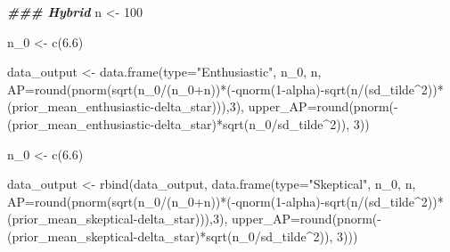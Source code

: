 \documentclass[
]{book}
\newenvironment{Shaded}{\begin{snugshade}}{\end{snugshade}}
\newcommand{\AttributeTok}[1]{\textcolor[rgb]{0.77,0.63,0.00}{#1}}
\newcommand{\DecValTok}[1]{\textcolor[rgb]{0.00,0.00,0.81}{#1}}
\newcommand{\DocumentationTok}[1]{\textcolor[rgb]{0.56,0.35,0.01}{\textbf{\textit{#1}}}}
\newcommand{\FloatTok}[1]{\textcolor[rgb]{0.00,0.00,0.81}{#1}}
\newcommand{\FunctionTok}[1]{\textcolor[rgb]{0.00,0.00,0.00}{#1}}
\newcommand{\NormalTok}[1]{#1}
\newcommand{\OtherTok}[1]{\textcolor[rgb]{0.56,0.35,0.01}{#1}}
\newcommand{\SpecialCharTok}[1]{\textcolor[rgb]{0.00,0.00,0.00}{#1}}
\newcommand{\StringTok}[1]{\textcolor[rgb]{0.31,0.60,0.02}{#1}}
\begin{document}
\begin{Shaded}
\begin{Highlighting}[]
\DocumentationTok{\#\#\# Hybrid}
\NormalTok{n }\OtherTok{\textless{}{-}} \DecValTok{100}

\NormalTok{n\_0 }\OtherTok{\textless{}{-}} \FunctionTok{c}\NormalTok{(}\FloatTok{6.6}\NormalTok{)}

\NormalTok{data\_output }\OtherTok{\textless{}{-}} \FunctionTok{data.frame}\NormalTok{(}\AttributeTok{type=}\StringTok{"Enthusiastic"}\NormalTok{, n\_0, n, }\AttributeTok{AP=}\FunctionTok{round}\NormalTok{(}\FunctionTok{pnorm}\NormalTok{(}\FunctionTok{sqrt}\NormalTok{(n\_0}\SpecialCharTok{/}\NormalTok{(n\_0}\SpecialCharTok{+}\NormalTok{n))}\SpecialCharTok{*}\NormalTok{(}\SpecialCharTok{{-}}\FunctionTok{qnorm}\NormalTok{(}\DecValTok{1}\SpecialCharTok{{-}}\NormalTok{alpha)}\SpecialCharTok{{-}}\FunctionTok{sqrt}\NormalTok{(n}\SpecialCharTok{/}\NormalTok{(sd\_tilde}\SpecialCharTok{\^{}}\DecValTok{2}\NormalTok{))}\SpecialCharTok{*}\NormalTok{(prior\_mean\_enthusiastic}\SpecialCharTok{{-}}\NormalTok{delta\_star))),}\DecValTok{3}\NormalTok{), }\AttributeTok{upper\_AP=}\FunctionTok{round}\NormalTok{(}\FunctionTok{pnorm}\NormalTok{(}\SpecialCharTok{{-}}\NormalTok{(prior\_mean\_enthusiastic}\SpecialCharTok{{-}}\NormalTok{delta\_star)}\SpecialCharTok{*}\FunctionTok{sqrt}\NormalTok{(n\_0}\SpecialCharTok{/}\NormalTok{sd\_tilde}\SpecialCharTok{\^{}}\DecValTok{2}\NormalTok{)), }\DecValTok{3}\NormalTok{))}

\NormalTok{n\_0 }\OtherTok{\textless{}{-}} \FunctionTok{c}\NormalTok{(}\FloatTok{6.6}\NormalTok{)}

\NormalTok{data\_output }\OtherTok{\textless{}{-}} \FunctionTok{rbind}\NormalTok{(data\_output, }\FunctionTok{data.frame}\NormalTok{(}\AttributeTok{type=}\StringTok{"Skeptical"}\NormalTok{, n\_0, n, }\AttributeTok{AP=}\FunctionTok{round}\NormalTok{(}\FunctionTok{pnorm}\NormalTok{(}\FunctionTok{sqrt}\NormalTok{(n\_0}\SpecialCharTok{/}\NormalTok{(n\_0}\SpecialCharTok{+}\NormalTok{n))}\SpecialCharTok{*}\NormalTok{(}\SpecialCharTok{{-}}\FunctionTok{qnorm}\NormalTok{(}\DecValTok{1}\SpecialCharTok{{-}}\NormalTok{alpha)}\SpecialCharTok{{-}}\FunctionTok{sqrt}\NormalTok{(n}\SpecialCharTok{/}\NormalTok{(sd\_tilde}\SpecialCharTok{\^{}}\DecValTok{2}\NormalTok{))}\SpecialCharTok{*}\NormalTok{(prior\_mean\_skeptical}\SpecialCharTok{{-}}\NormalTok{delta\_star))),}\DecValTok{3}\NormalTok{), }\AttributeTok{upper\_AP=}\FunctionTok{round}\NormalTok{(}\FunctionTok{pnorm}\NormalTok{(}\SpecialCharTok{{-}}\NormalTok{(prior\_mean\_skeptical}\SpecialCharTok{{-}}\NormalTok{delta\_star)}\SpecialCharTok{*}\FunctionTok{sqrt}\NormalTok{(n\_0}\SpecialCharTok{/}\NormalTok{sd\_tilde}\SpecialCharTok{\^{}}\DecValTok{2}\NormalTok{)), }\DecValTok{3}\NormalTok{)))}


\end{Highlighting}
\end{Shaded}
\end{document}
